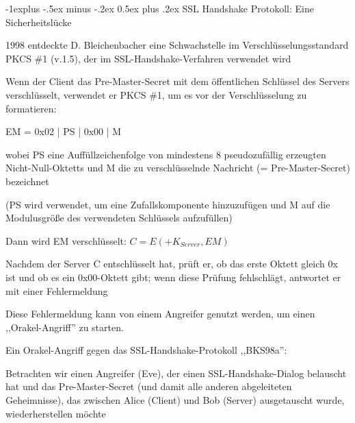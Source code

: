\documentclass[a4paper]{article}
\makeatletter
\renewcommand{\subsection}{\@startsection{subsection}{2}{0mm}%
 {-1explus -.5ex minus -.2ex}%
 {0.5ex plus .2ex}%
 {\normalfont\normalsize\bfseries}}
\makeatother
\begin{document}
\begin{multicols}{3}
\begin{itemize*}
            \subsection{SSL Handshake Protokoll: Eine
                  Sicherheitslücke}
            \begin{itemize*}
                  \item 1998 entdeckte D. Bleichenbacher eine Schwachstelle im
                  Verschlüsselungsstandard PKCS \#1 (v.1.5), der im
                  SSL-Handshake-Verfahren verwendet wird
                  \item Wenn der Client das Pre-Master-Secret mit dem öffentlichen Schlüssel
                  des Servers verschlüsselt, verwendet er PKCS \#1, um es vor der
                  Verschlüsselung zu formatieren:
                  \begin{itemize*}
                        \item EM = 0x02 | PS | 0x00 | M
                        \begin{itemize*} \item wobei PS eine Auffüllzeichenfolge von mindestens 8 pseudozufällig erzeugten Nicht-Null-Oktetts und M die zu verschlüsselnde Nachricht (= Pre-Master-Secret) bezeichnet \item (PS wird verwendet, um eine Zufallskomponente hinzuzufügen und M auf die Modulusgröße des verwendeten Schlüssels aufzufüllen) \end{itemize*}
                        \item Dann wird EM verschlüsselt: $C = E(+K_{Server}, EM)$
                        \item Nachdem der Server C entschlüsselt hat, prüft er, ob das erste Oktett gleich 0x ist und ob es ein 0x00-Oktett gibt; wenn diese Prüfung fehlschlägt, antwortet er mit einer Fehlermeldung
                        \item Diese Fehlermeldung kann von einem Angreifer genutzt werden, um einen ,,Orakel-Angriff'' zu starten.
                  \end{itemize*}
                  \item Ein Orakel-Angriff gegen das SSL-Handshake-Protokoll ,,BKS98a'':
                  \begin{itemize*}
                        \item Betrachten wir einen Angreifer (Eve), der einen SSL-Handshake-Dialog belauscht hat und das Pre-Master-Secret (und damit alle anderen abgeleiteten Geheimnisse), das zwischen Alice (Client) und Bob (Server) ausgetauscht wurde, wiederherstellen möchte

\end{itemize*}
\end{itemize*}
\end{itemize*}
\end{multicols}
\end{document}
